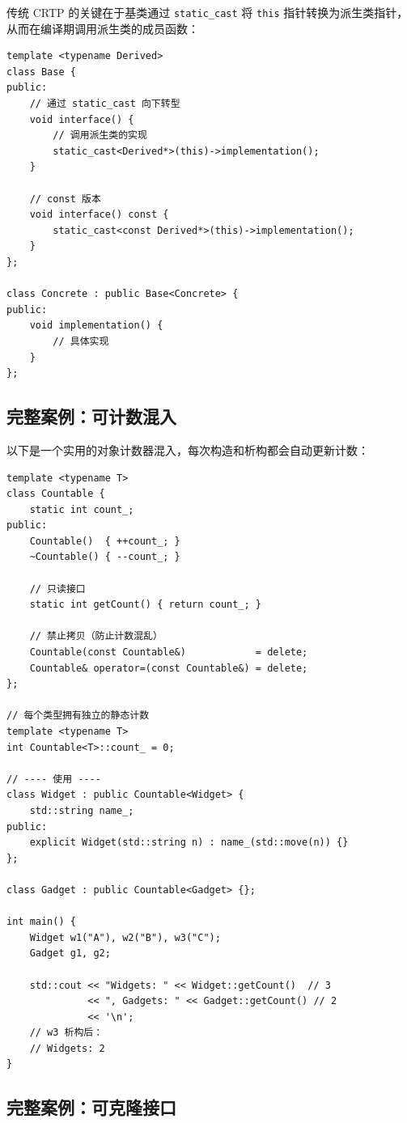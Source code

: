 \documentclass[12pt,a4paper,fontset=fandol]{ctexbook}
\begin{document}
传统 CRTP 的关键在于基类通过 \texttt{static\_cast} 将 \texttt{this} 指针转换为派生类指针，从而在编译期调用派生类的成员函数：

\begin{lstlisting}[caption={传统 CRTP 基本结构}]
template <typename Derived>
class Base {
public:
    // 通过 static_cast 向下转型
    void interface() {
        // 调用派生类的实现
        static_cast<Derived*>(this)->implementation();
    }

    // const 版本
    void interface() const {
        static_cast<const Derived*>(this)->implementation();
    }
};

class Concrete : public Base<Concrete> {
public:
    void implementation() {
        // 具体实现
    }
};
\end{lstlisting}

\subsection{完整案例：可计数混入}

以下是一个实用的对象计数器混入，每次构造和析构都会自动更新计数：

\begin{lstlisting}[caption={CRTP 计数器混入}]
template <typename T>
class Countable {
    static int count_;
public:
    Countable()  { ++count_; }
    ~Countable() { --count_; }

    // 只读接口
    static int getCount() { return count_; }

    // 禁止拷贝（防止计数混乱）
    Countable(const Countable&)            = delete;
    Countable& operator=(const Countable&) = delete;
};

// 每个类型拥有独立的静态计数
template <typename T>
int Countable<T>::count_ = 0;

// ---- 使用 ----
class Widget : public Countable<Widget> {
    std::string name_;
public:
    explicit Widget(std::string n) : name_(std::move(n)) {}
};

class Gadget : public Countable<Gadget> {};

int main() {
    Widget w1("A"), w2("B"), w3("C");
    Gadget g1, g2;

    std::cout << "Widgets: " << Widget::getCount()  // 3
              << ", Gadgets: " << Gadget::getCount() // 2
              << '\n';
    // w3 析构后：
    // Widgets: 2
}
\end{lstlisting}

\subsection{完整案例：可克隆接口}
\end{document}

